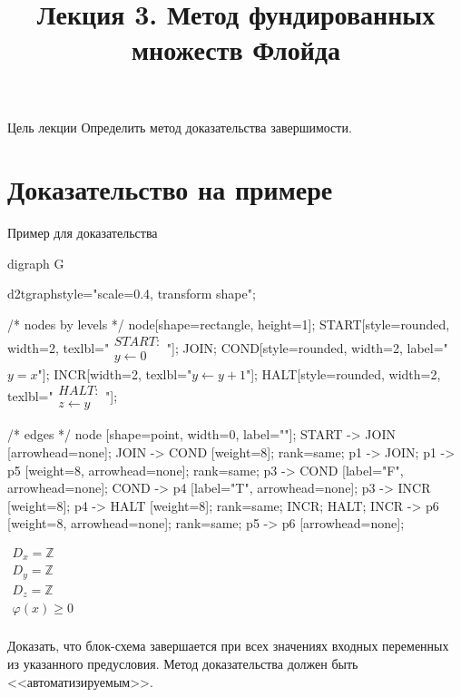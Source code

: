 \documentclass[hyperref={unicode=true}]{beamer}
\title{Лекция 3. Метод фундированных множеств Флойда}
\author{}
\date{}
\begin{document}
	\begin{frame}{}
		\titlepage
	\end{frame}

    \begin{frame}{Цель лекции}
    Определить метод доказательства завершимости.
    \end{frame}

    \section{Доказательство на примере}

	\begin{frame}[fragile]{Пример для доказательства}
	\begin{multicols}{2}

	\huge
	\begin{dot2tex}[options=-traw]
	digraph G{
		d2tgraphstyle="scale=0.4, transform shape";

		/* nodes by levels */
		node[shape=rectangle, height=1];
		START[style=rounded, width=2, texlbl="$\begin{matrix}START:\\ y \leftarrow 0\end{matrix}$"];
		JOIN;
        COND[style=rounded, width=2, label="$y = x$"];
		INCR[width=2, texlbl="$y \leftarrow y + 1$"];
        HALT[style=rounded, width=2, texlbl="$\begin{matrix}HALT:\\  z \leftarrow y\end{matrix}$"];

		/* edges */
		node [shape=point, width=0, label=""];
		START -> JOIN [arrowhead=none]; JOIN -> COND [weight=8];
		{ rank=same; p1 -> JOIN; }
		p1 -> p5 [weight=8, arrowhead=none];
		{ rank=same; p3 -> COND [label="F", arrowhead=none]; COND -> p4 [label="T", arrowhead=none]; }
		p3 -> INCR [weight=8];
		p4 -> HALT [weight=8];
		{ rank=same; INCR; HALT; }
		INCR -> p6 [weight=8, arrowhead=none];
		{ rank=same; p5 -> p6 [arrowhead=none]; }
	}
	\end{dot2tex}

	\normalsize

    $\begin{matrix}
    D_x = \mathbb{Z}\\
    D_y = \mathbb{Z}\\
    D_z = \mathbb{Z}\\
    \varphi(x) \geq 0\\
    \end{matrix}$

    Доказать, что блок-схема завершается при всех значениях входных переменных из указанного предусловия. Метод доказательства должен быть <<автоматизируемым>>.
	\end{multicols}

	\end{frame}
\end{document}
